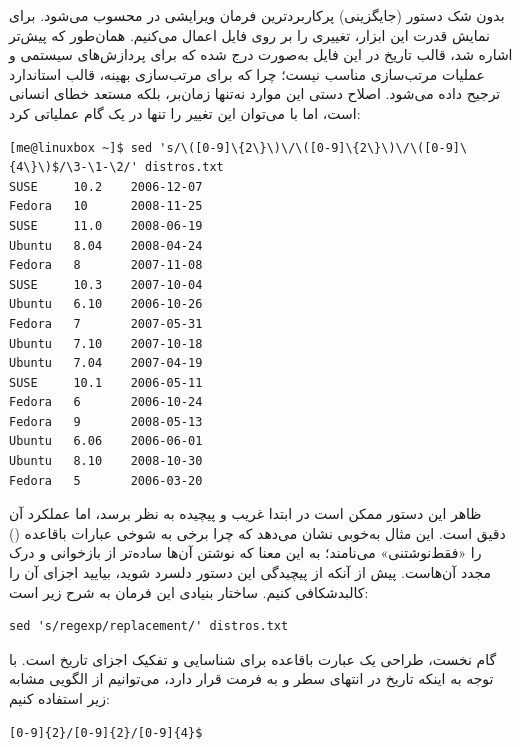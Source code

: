 بدون شک دستور  (جایگزینی) پرکاربردترین فرمان ویرایشی در  محسوب می‌شود. برای نمایش قدرت این ابزار، تغییری را بر روی فایل  اعمال می‌کنیم. همان‌طور که پیش‌تر اشاره شد، قالب تاریخ در این فایل به‌صورت  درج شده که برای پردازش‌های سیستمی و عملیات مرتب‌سازی مناسب نیست؛ چرا که برای مرتب‌سازی بهینه، قالب استاندارد  ترجیح داده می‌شود. اصلاح دستی این موارد نه‌تنها زمان‌بر، بلکه مستعد خطای انسانی است، اما با  می‌توان این تغییر را تنها در یک گام عملیاتی کرد:

\begin{latin}
\begin{lstlisting}
[me@linuxbox ~]$ sed 's/\([0-9]\{2\}\)\/\([0-9]\{2\}\)\/\([0-9]\{4\}\)$/\3-\1-\2/' distros.txt
SUSE     10.2    2006-12-07
Fedora   10      2008-11-25
SUSE     11.0    2008-06-19
Ubuntu   8.04    2008-04-24
Fedora   8       2007-11-08
SUSE     10.3    2007-10-04
Ubuntu   6.10    2006-10-26
Fedora   7       2007-05-31
Ubuntu   7.10    2007-10-18
Ubuntu   7.04    2007-04-19
SUSE     10.1    2006-05-11
Fedora   6       2006-10-24
Fedora   9       2008-05-13
Ubuntu   6.06    2006-06-01
Ubuntu   8.10    2008-10-30
Fedora   5       2006-03-20
\end{lstlisting}
\end{latin}

ظاهر این دستور ممکن است در ابتدا غریب و پیچیده به نظر برسد، اما عملکرد آن دقیق است. این مثال به‌خوبی نشان می‌دهد که چرا برخی به شوخی عبارات باقاعده () را «فقط‌نوشتنی» می‌نامند؛ به این معنا که نوشتن آن‌ها ساده‌تر از بازخوانی و درک مجدد آن‌هاست. پیش از آنکه از پیچیدگی این دستور دلسرد شوید، بیایید اجزای آن را کالبدشکافی کنیم. ساختار بنیادی این فرمان به شرح زیر است:

\begin{latin}
\begin{lstlisting}
sed 's/regexp/replacement/' distros.txt
\end{lstlisting}
\end{latin}

گام نخست، طراحی یک عبارت باقاعده برای شناسایی و تفکیک اجزای تاریخ است. با توجه به اینکه تاریخ در انتهای سطر و به فرمت  قرار دارد، می‌توانیم از الگویی مشابه زیر استفاده کنیم:

\begin{latin}
\begin{lstlisting}
[0-9]{2}/[0-9]{2}/[0-9]{4}$
\end{lstlisting}
\end{latin}

